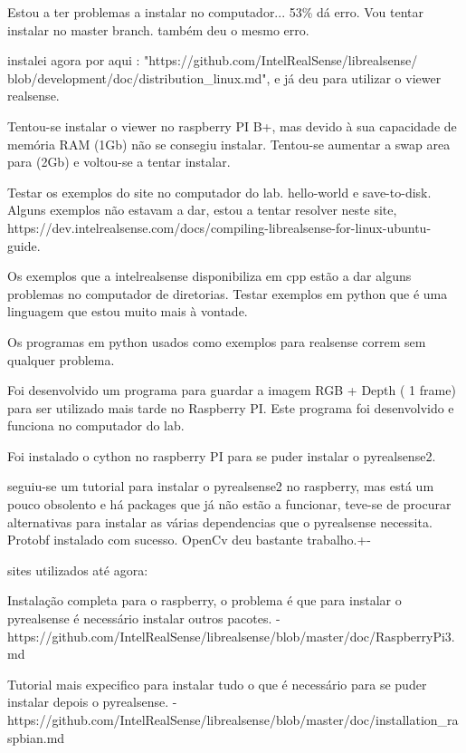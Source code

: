     Estou a ter problemas a instalar no computador... 53\% dá erro. Vou tentar instalar no master branch. também deu o mesmo erro.
    
    instalei agora por aqui : "https://github.com/IntelRealSense/librealsense/ blob/development/doc/distribution\_linux.md", e já deu para utilizar o viewer realsense.
    
    \bigskip
    
    Tentou-se instalar o viewer no raspberry PI B+, mas devido à sua capacidade de memória RAM (1Gb) não se consegiu instalar. Tentou-se aumentar a swap area para (2Gb) e voltou-se a tentar instalar.
    
    \bigskip
    
    Testar os exemplos do site no computador do lab. hello-world e save-to-disk.
    Alguns exemplos não estavam a dar, estou a tentar resolver neste site, https://dev.intelrealsense.com/docs/compiling-librealsense-for-linux-ubuntu-guide.

    Os exemplos que a intelrealsense disponibiliza em cpp estão a dar alguns problemas no computador de diretorias. Testar exemplos em python que é uma linguagem que estou muito mais à vontade.
    
    Os programas em python usados como exemplos para realsense correm sem qualquer problema.
    
    Foi desenvolvido um programa para guardar a imagem RGB + Depth ( 1 frame) para ser utilizado mais tarde no Raspberry PI. Este programa foi desenvolvido e funciona no computador do lab.
    
    Foi instalado o cython no raspberry PI para se puder instalar o pyrealsense2.

    seguiu-se um tutorial para instalar o pyrealsense2 no raspberry, mas está um pouco obsolento e há packages que já não estão a funcionar, teve-se de procurar alternativas para instalar as várias dependencias que o pyrealsense necessita. Protobf instalado com sucesso. OpenCv deu bastante trabalho.+-

    sites utilizados até agora:
    
    Instalação completa para o raspberry, o problema é que para instalar o pyrealsense é necessário instalar outros pacotes.
    -https://github.com/IntelRealSense/librealsense/blob/master/doc/RaspberryPi3.md
    
    Tutorial mais expecifico para instalar tudo o que é necessário para se puder instalar depois o pyrealsense.
    -https://github.com/IntelRealSense/librealsense/blob/master/doc/installation\_raspbian.md
    
